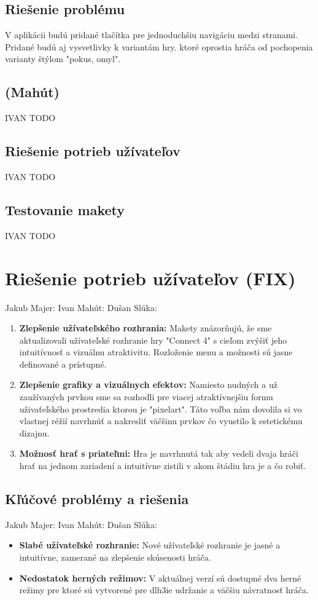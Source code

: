 \documentclass[a4paper, 11pt, onecolumn]{article}
\begin{document}
\subsection*{Riešenie problému}
V aplikácii budú pridané tlačítka pre jednoduchšiu navigáciu medzi stranami.
Pridané budú aj vysvetlivky k variantám hry. ktoré oprostia hráča od pochopenia varianty
štýlom "pokus, omyl".
\subsection{(Mahút)}
IVAN TODO
\subsection*{Riešenie potrieb užívateľov}
IVAN TODO
\subsection{Testovanie makety}
IVAN TODO



\section{Riešenie potrieb užívateľov (FIX)}
Jakub Majer:
Ivan Mahút:
Dušan Slúka:
\begin{enumerate}
    \item \textbf{Zlepšenie užívateľského rozhrania:} Makety znázorňujú, že sme aktualizovali užívateľské rozhranie hry "Connect 4" s cieľom zvýšiť jeho intuitívnosť a vizuálnu atraktivitu. Rozloženie menu a možnosti sú jasne definované a prístupné.
    \item \textbf{Zlepšenie grafiky a vizuálnych efektov:} Namiesto nudných a už zaužívaných prvkou sme sa rozhodli pre viacej atraktívnejšiu formu uživaťeľského prostredia ktorou je "pixelart". Táto voľba nám dovolila si vo vlastnej réžií navrhnúť a nakresliť väčšinu prvkov čo vyustilo k estetickému dizajnu.
    \item \textbf{Možnosť hrať s priateľmi:} Hra je navrhnutá tak aby vedeli dvaja hráči hrať na jednom zariadení a intuitívne zistili v akom štádiu hra je a čo robiť.
\end{enumerate}

\subsection{Kľúčové problémy a riešenia}
Jakub Majer:
Ivan Mahút:
Dušan Slúka:
\begin{itemize}
    \item \textbf{Slabé užívateľské rozhranie:} Nové užívateľské rozhranie je jasné a intuitívne, zamerané na zlepšenie skúsenosti hráča.
    \item \textbf{Nedostatok herných režimov:} V aktuálnej verzí sú dostupné dva herné režimy pre ktoré sú vytvorené pre dlh3ie udržanie a väčšiu návratnosť hráča.
\end{itemize}
\end{document}
